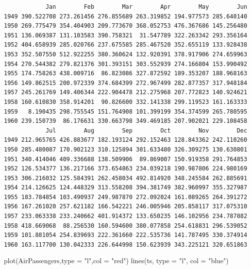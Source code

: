 \documentclass[
  letterpaper,
  DIV=11,
  numbers=noendperiod]{scrreprt}
\newenvironment{Shaded}{\begin{snugshade}}{\end{snugshade}}
\newcommand{\AttributeTok}[1]{\textcolor[rgb]{0.40,0.45,0.13}{#1}}
\newcommand{\FunctionTok}[1]{\textcolor[rgb]{0.28,0.35,0.67}{#1}}
\newcommand{\NormalTok}[1]{\textcolor[rgb]{0.00,0.23,0.31}{#1}}
\newcommand{\StringTok}[1]{\textcolor[rgb]{0.13,0.47,0.30}{#1}}
\begin{document}
\begin{verbatim}
            Jan        Feb        Mar        Apr        May        Jun
1949 390.522708 273.261456 276.855689 263.319852 194.977573 285.640140
1950 269.775479 354.404903 209.773670 368.052753 476.367686 145.256480
1951 136.069387 131.103583 390.758321  31.547789 322.263342 293.356164
1952 404.658939 285.020766 237.675585 285.467520 352.655119 133.928438
1953 352.507550 512.922255 380.360624 132.920391 378.917906 274.659963
1954 270.544382 279.821376 301.393151 303.552939 274.166804 153.990492
1955 174.758263 438.009716  86.823086 327.872592 189.353207 188.968163
1956 149.862515 200.972339 374.684399 272.967499 282.877357 317.948184
1957 245.261769 149.406344 222.904478 212.275968 207.772823 140.924621
1958 160.610830 358.914201  90.826600 332.141338 299.119523 161.163333
1959   8.190435 298.755545 151.764908 101.399199 354.374599 265.780595
1960 239.150739  86.176631 330.663798 349.469185 207.902021 229.108458
            Jul        Aug        Sep        Oct        Nov        Dec
1949 212.965765 426.883677 182.193124 292.152463 128.843362 242.110260
1950 285.480087 170.902123 310.125894 301.633480 326.309275 130.630801
1951 340.414046 409.336688 138.509906  89.869007 150.919358 291.764853
1952 126.534377 136.217166 373.654863 234.039218 190.987806 224.980169
1953 306.216032 125.584391 262.458034 492.814920 348.245584 262.885691
1954 214.126625 124.448329 313.558208 394.381749 382.960997 355.327987
1955 183.784854 103.490937 249.987870 272.092024 161.089265 264.391272
1956 167.261020 257.621182 166.542221 246.005946 205.858117 317.075310
1957 233.063338 233.240662 401.914372 133.650235 146.102956 234.787882
1958 418.669068  88.256530 160.594600 380.077858 254.618831 296.539052
1959 101.881054 254.839693 222.361660 222.535736 141.787495 330.374914
1960 163.117700 130.042333 226.644998 150.623939 343.225121 320.651863
\end{verbatim}

\begin{Shaded}
\begin{Highlighting}[]
\FunctionTok{plot}\NormalTok{(AirPassengers,}\AttributeTok{type =} \StringTok{"l"}\NormalTok{,}\AttributeTok{col =} \StringTok{"red"}\NormalTok{)}
\FunctionTok{lines}\NormalTok{(ts, }\AttributeTok{type =} \StringTok{"l"}\NormalTok{, }\AttributeTok{col =} \StringTok{"blue"}\NormalTok{)}
\end{Highlighting}
\end{Shaded}
\end{document}
